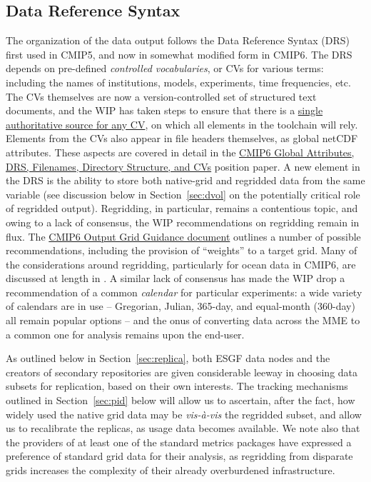 \documentclass[gmd,manuscript]{copernicus}
\newcommand{\bibref}[1] { \cite{ref:#1}}
\newcommand{\secref}[1] {\mbox{Section  \ref{sec:#1}}}
\begin{document}
\subsection{Data Reference Syntax}
\label{sec:data-drs}

The organization of the data output follows the Data Reference Syntax
(DRS) first used in CMIP5, and now in somewhat modified form in CMIP6.
The DRS depends on pre-defined \emph{controlled vocabularies}, or CVs
for various terms: including the names of institutions, models,
experiments, time frequencies, etc. The CVs themselves are now a
version-controlled set of structured text documents, and the WIP has
taken steps to ensure that there is a
\href{https://goo.gl/HGafnJ}{single authoritative source for any CV},
on which all elements in the toolchain will rely. Elements from the
CVs also appear in file headers themselves, as global netCDF
attributes. These aspects are covered in detail in the
\href{https://goo.gl/cMiPE7}{CMIP6 Global Attributes, DRS, Filenames,
  Directory Structure, and CVs} position paper. A new element in the
DRS is the ability to store both native-grid and regridded data from
the same variable (see discussion below in \secref{dvol} on the
potentially critical role of regridded output). Regridding, in
particular, remains a contentious topic, and owing to a lack of
consensus, the WIP recommendations on regridding remain in flux. The
\href{https://goo.gl/wVtm5t}{CMIP6 Output Grid Guidance document}
outlines a number of possible recommendations, including the provision
of ``weights'' to a target grid. Many of the considerations around
regridding, particularly for ocean data in CMIP6, are discussed at
length in \bibref{griffiesetal2016}. A similar lack of consensus has
made the WIP drop a recommendation of a common \emph{calendar} for
particular experiments: a wide variety of calendars are in use --
Gregorian, Julian, 365-day, and equal-month (360-day) all remain
popular options -- and the onus of converting data across the MME to a
common one for analysis remains upon the end-user.

As outlined below in \secref{replica}, both ESGF data nodes and the
creators of secondary repositories are given considerable leeway in
choosing data subsets for replication, based on their own interests.
The tracking mechanisms outlined in \secref{pid} below will allow us
to ascertain, after the fact, how widely used the native grid data may
be \emph{vis-\`a-vis} the regridded subset, and allow us to
recalibrate the replicas, as usage data becomes available. We note
also that the providers of at least one of the standard metrics
packages \citep[ESMValTool,][]{ref:eyringetal2016a} have expressed a
preference of standard grid data for their analysis, as regridding
from disparate grids increases the complexity of their already
overburdened infrastructure.
\end{document}
